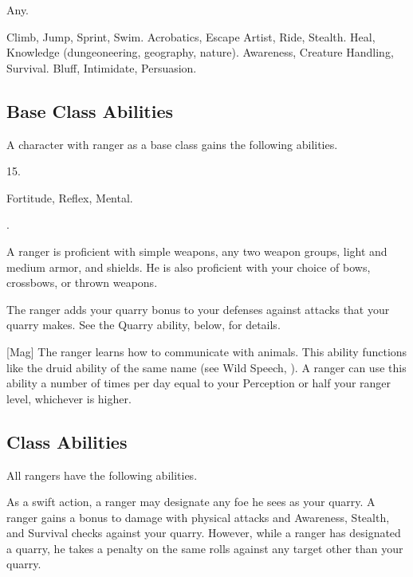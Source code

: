      Any.

     Climb, Jump, Sprint, Swim.
     Acrobatics, Escape Artist, Ride, Stealth.
     Heal, Knowledge (dungeoneering, geography, nature).
     Awareness, Creature Handling, Survival.
     Bluff, Intimidate, Persuasion.

    \subsection{Base Class Abilities}
        A character with ranger as a base class gains the following abilities.

         15.

          Fortitude,  Reflex,  Mental.

         .

        A ranger is proficient with simple weapons, any two weapon groups, light and medium armor, and shields.
        He is also proficient with your choice of bows, crossbows, or thrown weapons.

        The ranger adds your quarry bonus to your defenses against attacks that your quarry makes.
        See the Quarry ability, below, for details.

        [Mag]
        The ranger learns how to communicate with animals.
        This ability functions like the druid ability of the same name (see Wild Speech, ).
        A ranger can use this ability a number of times per day equal to your Perception or half your ranger level, whichever is higher.

    \subsection{Class Abilities}
        All rangers have the following abilities.

        As a swift action, a ranger may designate any foe he sees as your quarry.
        A ranger gains a  bonus to damage with physical attacks and Awareness, Stealth, and Survival checks against your quarry.
        However, while a ranger has designated a quarry, he takes a  penalty on the same rolls against any target other than your quarry.

